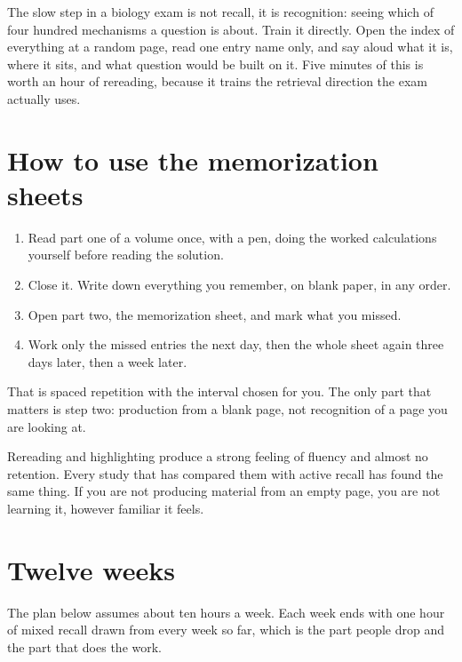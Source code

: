 \begin{tipbox}[title={TECHNIQUE: the recognition drill}]
The slow step in a biology exam is not recall, it is recognition: seeing which of four
hundred mechanisms a question is about. Train it directly. Open the index of everything
at a random page, read one entry name only, and say aloud what it is, where it sits, and
what question would be built on it. Five minutes of this is worth an hour of rereading,
because it trains the retrieval direction the exam actually uses.
\end{tipbox}

\section{How to use the memorization sheets}

\begin{keybox}[title={The loop}]
\begin{enumerate}
\item Read part one of a volume once, with a pen, doing the worked calculations
      yourself before reading the solution.
\item Close it. Write down everything you remember, on blank paper, in any order.
\item Open part two, the memorization sheet, and mark what you missed.
\item Work only the missed entries the next day, then the whole sheet again three days
      later, then a week later.
\end{enumerate}
That is spaced repetition with the interval chosen for you. The only part that matters
is step two: production from a blank page, not recognition of a page you are looking at.
\end{keybox}

\begin{warnbox}[title={TRAP: highlighting feels like learning}]
Rereading and highlighting produce a strong feeling of fluency and almost no retention.
Every study that has compared them with active recall has found the same thing. If you
are not producing material from an empty page, you are not learning it, however
familiar it feels.
\end{warnbox}

\section{Twelve weeks}

The plan below assumes about ten hours a week. Each week ends with one hour of mixed
recall drawn from every week so far, which is the part people drop and the part that
does the work.

